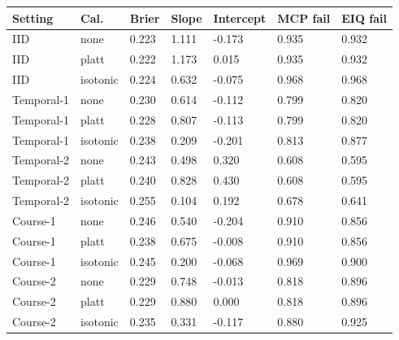 \begin{tabular}{lllllll}
\toprule
Setting & Cal. & Brier & Slope & Intercept & MCP fail & EIQ fail\\
\midrule
IID & none & 0.223 & 1.111 & -0.173 & 0.935 & 0.932\\
IID & platt & 0.222 & 1.173 & 0.015 & 0.935 & 0.932\\
IID & isotonic & 0.224 & 0.632 & -0.075 & 0.968 & 0.968\\
Temporal-1 & none & 0.230 & 0.614 & -0.112 & 0.799 & 0.820\\
Temporal-1 & platt & 0.228 & 0.807 & -0.113 & 0.799 & 0.820\\
Temporal-1 & isotonic & 0.238 & 0.209 & -0.201 & 0.813 & 0.877\\
Temporal-2 & none & 0.243 & 0.498 & 0.320 & 0.608 & 0.595\\
Temporal-2 & platt & 0.240 & 0.828 & 0.430 & 0.608 & 0.595\\
Temporal-2 & isotonic & 0.255 & 0.104 & 0.192 & 0.678 & 0.641\\
Course-1 & none & 0.246 & 0.540 & -0.204 & 0.910 & 0.856\\
Course-1 & platt & 0.238 & 0.675 & -0.008 & 0.910 & 0.856\\
Course-1 & isotonic & 0.245 & 0.200 & -0.068 & 0.969 & 0.900\\
Course-2 & none & 0.229 & 0.748 & -0.013 & 0.818 & 0.896\\
Course-2 & platt & 0.229 & 0.880 & 0.000 & 0.818 & 0.896\\
Course-2 & isotonic & 0.235 & 0.331 & -0.117 & 0.880 & 0.925\\
\bottomrule
\end{tabular}